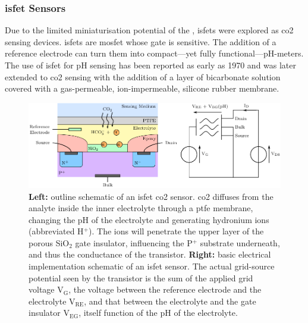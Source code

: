 \subsubsection{\texorpdfstring{\gls{isfet}}{ISFET} Sensors}\label{subsect:choos:review:isfet}

Due to the limited miniaturisation potential of the \ssel, \glspl{isfet} were explored as \gls{co2} sensing devices. \glspl{isfet} are \gls{mosfet} whose gate is  sensitive. The addition of a reference electrode can turn them into compact---yet fully functional---pH-meters. The use of \gls{isfet} for pH sensing has been reported as early as 1970\cite{bergveld1970} and was later extended to \gls{co2} sensing with the addition of a layer of bicarbonate solution covered with a gas-permeable, ion-impermeable, silicone rubber membrane\cite{hu1989}.

\begin{figure}
	\centering
	\includegraphics[width=\linewidth]{1_main_matter/choos_figures/review/isfet_converted}
	\caption[\gls{isfet} sensors.]{\textbf{Left:} outline schematic of an \gls{isfet} \gls{co2} sensor. \gls{co2} diffuses from the analyte inside the inner electrolyte through a \gls{ptfe} membrane, changing the pH of the electrolyte and generating hydronium ions (abbreviated H$^+$). The ions will penetrate the upper layer of the porous SiO$_2$ gate insulator, influencing the P$^+$ substrate underneath, and thus the conductance of the transistor. \textbf{Right:} basic electrical implementation schematic of an \gls{isfet} sensor. The actual grid-source potential seen by the transistor is the sum of the applied grid voltage V$_\text{G}$, the voltage between the reference electrode and the electrolyte V$_\text{RE}$, and that between the electrolyte and the gate insulator V$_\text{EG}$, itself function of the pH of the electrolyte.}
	\label{fig:choos:review:isfet}
\end{figure}

